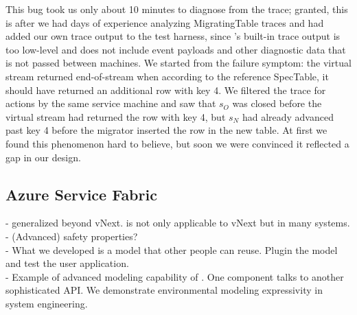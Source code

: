 This bug took us only about 10 minutes to diagnose from the trace; granted, this is after we had days of experience analyzing MigratingTable traces and had added our own trace output to the test harness, since \psharp's built-in trace output is too low-level and does not include event payloads and other diagnostic data that is not passed between machines.  We started from the failure symptom: the virtual stream returned end-of-stream when according to the reference SpecTable, it should have returned an additional row with key 4.  We filtered the trace for actions by the same service machine and saw that $s_O$ was closed before the virtual stream had returned the row with key 4, but $s_N$ had already advanced past key 4 before the migrator inserted the row in the new table.  At first we found this phenomenon hard to believe, but soon we were convinced it reflected a gap in our design.

\subsection{Azure Service Fabric}
\label{sec:cases:fabric}

- \psharp generalized beyond vNext. \psharp is not only applicable to vNext but in many systems.\\
- (Advanced) safety properties?\\
- What we developed is a model that other people can reuse. Plugin the model and test the user application.\\
- Example of advanced modeling capability of \psharp. One component talks to another sophisticated API. We demonstrate environmental modeling expressivity in system engineering.

